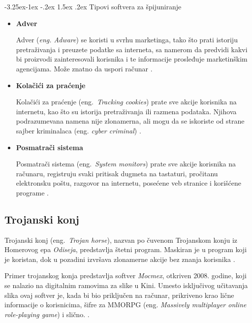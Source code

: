 \documentclass[a4paper]{article}
\makeatletter
\renewcommand\paragraph{\@startsection{paragraph}{4}{\z@}%
   {-3.25ex\@plus -1ex \@minus -.2ex}%
   {1.5ex \@plus .2ex}%
   {\normalfont\normalsize\bfseries}}
\makeatother
\begin{document}
\paragraph{Tipovi softvera za špijuniranje}
\begin{itemize}
\item \textbf{Adver}

Adver (\textit{eng. Adware}) se koristi u svrhu marketinga, tako što prati istoriju pretraživanja i preuzete podatke sa interneta, sa namerom da predvidi kakvi bi proizvodi zainteresovali korisnika i te informacije prosleđuje marketinškim agencijama. Može znatno da uspori računar \cite{spyware}.

\item \textbf{Kolačići za praćenje}

Kolačići za praćenje (eng.~{\em Tracking cookies}) prate sve akcije korisnika na internetu, kao što su istorija pretraživanja ili razmena podataka. Njihova podrazumevana namena nije zlonamerna, ali mogu da se iskoriste od strane sajber kriminalaca (eng. \textit{cyber criminal}) \cite{tracking_cookies}.

\item \textbf{Posmatrači sistema}

Posmatrači sistema (eng.~{\em System monitors}) prate sve akcije korisnika na računaru, registruju svaki pritisak dugmeta na tastaturi, pročitanu elektronsku poštu, razgovor na internetu, posećene veb stranice i korišćene programe \cite{spyware}.
    
\end{itemize}

\subsection{Trojanski konj}
\label{Odisej}

Trojanski konj (eng.~{\em Trojan horse}), nazvan po čuvenom Trojanskom konju iz Homerovog epa \textit{Odiseja}, predstavlja štetni program. Maskiran je u program koji je koristan, dok u pozadini izvršava zlonamerne akcije bez znanja korisnika \cite{trojanhorse}.

Primer trojanskog konja predstavlja softver \textit{Mocmex}, otkriven 2008. godine, koji se nalazio na digitalnim ramovima za slike u Kini. Umesto isključivog učitavanja slika ovaj softver je, kada bi bio priključen na računar, prikriveno krao lične informacije o korisnicima, šifre za MMORPG (eng. \textit{Massively multiplayer online role-playing game}) i slično. \cite{ethics}. 
\end{document}
